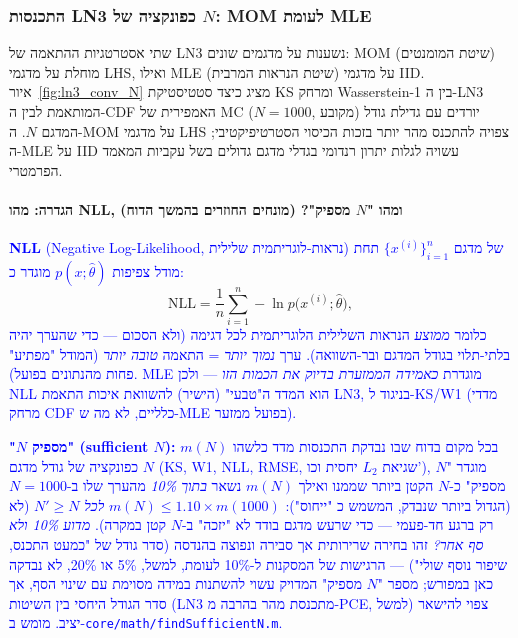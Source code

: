 \documentclass[12pt,a4paper]{article}
\DeclareRobustCommand{\aiedit}[1]{\textcolor{blue}{#1}}
\begin{document}
\subsubsection{התכנסות \textenglish{LN3} כפונקציה של $N$: \textenglish{MOM} לעומת \textenglish{MLE}}
\label{sec:ln3_conv_N}

שתי אסטרטגיות ההתאמה של \textenglish{LN3} נשענות על מדגמים שונים:
\textenglish{MOM} (שיטת המומנטים) מוחלת על מדגמי \textenglish{LHS},
ואילו \textenglish{MLE} (שיטת הנראות המרבית) על מדגמי \textenglish{IID}.
איור~\ref{fig:ln3_conv_N} מציג כיצד סטטיסטיקת \textenglish{KS} ומרחק \textenglish{Wasserstein-1}
בין ה-\textenglish{LN3} המותאמת לבין ה-\textenglish{CDF} האמפירית של \textenglish{MC}
($N=1000$, מקובע) יורדים עם גדילת גודל המדגם $N$.
ה-\textenglish{MOM} על מדגמי \textenglish{LHS} צפויה להתכנס מהר יותר בזכות הכיסוי
הסטרטיפיקטיבי; ה-\textenglish{MLE} על \textenglish{IID} עשויה לגלות יתרון רנדומי בגדלי
מדגם גדולים בשל עקביות המאמד הפרמטרי.

\paragraph{הגדרה: מהו NLL, ומהו "$N$ מספיק"? (מונחים החוזרים בהמשך הדוח)}
\aiedit{\textbf{NLL} (\textenglish{Negative Log-Likelihood}, נראות-לוגריתמית שלילית) של מדגם
$\{x^{(i)}\}_{i=1}^n$ תחת מודל צפיפות $p(x;\hat\theta)$ מוגדר כ:}
\[
  \mathrm{NLL} = \frac{1}{n}\sum_{i=1}^n -\ln p\bigl(x^{(i)};\hat\theta\bigr),
\]
\aiedit{כלומר \emph{ממוצע} הנראות השלילית הלוגריתמית לכל דגימה (ולא הסכום — כדי שהערך יהיה
בלתי-תלוי בגודל המדגם ובר-השוואה). ערך \emph{נמוך יותר} = התאמה \emph{טובה יותר}
(המודל "מפתיע" פחות מהנתונים בפועל). \textenglish{MLE} מוגדרת \emph{כאמידה הממזערת
בדיוק את הכמות הזו} — ולכן NLL הוא המדד ה"טבעי" (הישיר) להשוואת איכות התאמת
\textenglish{LN3}, בניגוד ל-KS/W1 (מדדי מרחק CDF כלליים, לא מה ש-MLE בפועל ממזער).}

\aiedit{\textbf{"$N$ מספיק" (\textenglish{sufficient $N$}):} בכל מקום בדוח שבו נבדקת התכנסות מדד כלשהו
$m(N)$ כפונקציה של גודל מדגם $N$ (KS, W1, NLL, RMSE, שגיאת $L_2$ יחסית וכו'), מוגדר
"$N$ מספיק" כ-$N$ הקטן ביותר שממנו ואילך $m(N)$ נשאר \emph{בתוך 10\%{}} מהערך שלו
ב-$N=1000$ (הגדול ביותר שנבדק, המשמש כ "ייחוס"):
$m(N) \leq 1.10\times m(1000)$ \emph{לכל} $N'\geq N$ (לא רק ברגע חד-פעמי — כדי שרעש
מדגם בודד לא "יזכה" ב-$N$ קטן במקרה). \emph{מדוע 10\%{} ולא סף אחר?} זהו בחירה שרירותית
אך סבירה ונפוצה בהנדסה (סדר גודל של "כמעט התכנס, שיפור נוסף שולי") — הרגישות של המסקנות
ל-10\%{} לעומת, למשל, 5\%{} או 20\%{}, לא נבדקה כאן במפורש; מספר "$N$ מספיק" המדויק
עשוי להשתנות במידה מסוימת עם שינוי הסף, אך סדר הגודל היחסי בין השיטות (LN3 מתכנסת
מהר בהרבה מ-PCE, למשל) צפוי להישאר יציב. מומש ב-\texttt{core/math/findSufficientN.m}.}
\end{document}
